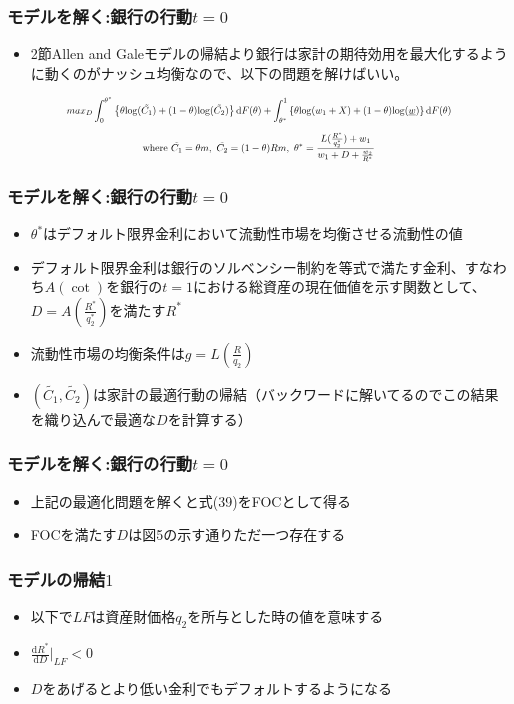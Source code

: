 \documentclass[dvipdfmx, 12pt]{beamer}
\begin{document}
\begin{frame}\frametitle{モデルを解く:銀行の行動$t = 0$}
	\begin{itemize}
		\item 2節Allen and Galeモデルの帰結より銀行は家計の期待効用を最大化するように動くのがナッシュ均衡なので、以下の問題を解けばいい。
	\end{itemize}
	\begin{align*}
	\scalebox{0.7}{$\displaystyle
	max_{D} \int_0^{\theta^*}\left\{ \theta{\rm log}(\tilde{C_1})+(1-\theta){\rm log}(\tilde{C_2}) \right\}\mathrm{d}F(\theta) + \int_{\theta^*}^1 \left\{ \theta{\rm log}(w_1+X)+(1-\theta){\rm log}(\underline{w}) \right\}\mathrm{d}F(\theta)
	$}
	\end{align*}
	\begin{align*}
	\scalebox{0.7}{$\displaystyle
		\text{where}\ \tilde{C_1} = \theta m,\ \tilde{C_2} = (1-\theta)Rm,\ \theta^* = \frac{L(\frac{R^*}{q_2^*}) + w_1}{w_1 + D + \frac{w_2}{R^*}}
		$}
	\end{align*}
\end{frame}

\begin{frame}\frametitle{モデルを解く:銀行の行動$t = 0$}
	\begin{itemize}
		\item $\theta^*$はデフォルト限界金利において流動性市場を均衡させる流動性の値
		\item デフォルト限界金利は銀行のソルベンシー制約を等式で満たす金利、すなわち$A(\cot)$を銀行の$t=1$における総資産の現在価値を示す関数として、$D = A\left( \frac{R^*}{q_2^*} \right)$を満たす$R^*$
		\item 流動性市場の均衡条件は$g = L\left(\frac{R}{q_2}\right)$
		\item $(\tilde{C_1}, \tilde{C_2})$は家計の最適行動の帰結（バックワードに解いてるのでこの結果を織り込んで最適な$D$を計算する）
	\end{itemize}
\end{frame}

\begin{frame}\frametitle{モデルを解く:銀行の行動$t = 0$}
	\begin{itemize}
		\item 上記の最適化問題を解くと式(39)をFOCとして得る
		\item FOCを満たす$D$は図5の示す通りただ一つ存在する
	\end{itemize}
\end{frame}

\begin{frame}\frametitle{モデルの帰結$1$}
	\begin{itemize}
		\item 以下で$LF$は資産財価格$q_2$を所与とした時の値を意味する
		\item $\frac{\mathrm{d}R^*}{\mathrm{d}D}|_{LF} < 0$
		\item $D$をあげるとより低い金利でもデフォルトするようになる
	\end{itemize}
\end{frame}
\end{document}
